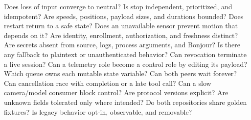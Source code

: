 {}\markdownRendererSectionBegin
{}\markdownRendererInterblockSeparator
{}\markdownRendererUlBegin
\markdownRendererUlItem Does loss of input converge to neutral?\markdownRendererUlItemEnd 
\markdownRendererUlItem Is stop independent, prioritized, and idempotent?\markdownRendererUlItemEnd 
\markdownRendererUlItem Are speeds, positions, payload sizes, and durations bounded?\markdownRendererUlItemEnd 
\markdownRendererUlItem Does restart return to a safe state?\markdownRendererUlItemEnd 
\markdownRendererUlItem Does an unavailable sensor prevent motion that depends on it?\markdownRendererUlItemEnd 
\markdownRendererUlEnd \markdownRendererInterblockSeparator
{}
\markdownRendererSectionEnd \markdownRendererSectionBegin
{}\markdownRendererInterblockSeparator
{}\markdownRendererUlBegin
\markdownRendererUlItem Are identity, enrollment, authorization, and freshness distinct?\markdownRendererUlItemEnd 
\markdownRendererUlItem Are secrets absent from source, logs, process arguments, and Bonjour?\markdownRendererUlItemEnd 
\markdownRendererUlItem Is there any fallback to plaintext or unauthenticated behavior?\markdownRendererUlItemEnd 
\markdownRendererUlItem Can revocation terminate a live session?\markdownRendererUlItemEnd 
\markdownRendererUlItem Can a telemetry role become a control role by editing its payload?\markdownRendererUlItemEnd 
\markdownRendererUlEnd \markdownRendererInterblockSeparator
{}
\markdownRendererSectionEnd \markdownRendererSectionBegin
{}\markdownRendererInterblockSeparator
{}\markdownRendererUlBegin
\markdownRendererUlItem Which queue owns each mutable state variable?\markdownRendererUlItemEnd 
\markdownRendererUlItem Can both peers wait forever?\markdownRendererUlItemEnd 
\markdownRendererUlItem Can cancellation race with completion or a late tool call?\markdownRendererUlItemEnd 
\markdownRendererUlItem Can a slow camera/model consumer block control?\markdownRendererUlItemEnd 
\markdownRendererUlEnd \markdownRendererInterblockSeparator
{}
\markdownRendererSectionEnd \markdownRendererSectionBegin
{}\markdownRendererInterblockSeparator
{}\markdownRendererUlBegin
\markdownRendererUlItem Are protocol versions explicit?\markdownRendererUlItemEnd 
\markdownRendererUlItem Are unknown fields tolerated only where intended?\markdownRendererUlItemEnd 
\markdownRendererUlItem Do both repositories share golden fixtures?\markdownRendererUlItemEnd 
\markdownRendererUlItem Is legacy behavior opt-in, observable, and removable?\markdownRendererUlItemEnd 
